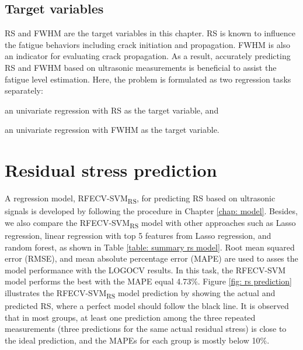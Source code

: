 \subsection{Target variables}
RS and FWHM are the target variables in this chapter. RS is known to influence the fatigue behaviors including crack initiation and propagation. FWHM is also an indicator for evaluating crack propagation. As a result, accurately predicting RS and FWHM based on ultrasonic measurements is beneficial to assist the fatigue level estimation. Here, the problem is formulated as two regression tasks separately:
\begin{enumerate*}[label=\itshape\alph*\upshape)]
    \item an univariate regression with RS as the target variable, and
    \item an univariate regression with FWHM as the target variable.
\end{enumerate*}


\section{Residual stress prediction}
\label{sec: rs prediction}
A regression model, RFECV-SVM\textsubscript{RS}, for predicting RS based on ultrasonic signals is developed by following the procedure in Chapter \ref{chap: model}. Besides, we also compare the RFECV-SVM\textsubscript{RS} model with other approaches such as Lasso regression, linear regression with top 5 features from Lasso regression, and random forest, as shown in Table \ref{table: summary rs model}. Root mean squared error (RMSE), and mean absolute percentage error (MAPE) are used to asses the model performance with the LOGOCV results. In this task, the RFECV-SVM model performs the best with the MAPE equal 4.73\%. Figure \ref{fig: rs prediction} illustrates the RFECV-SVM\textsubscript{RS} model prediction by showing the actual and predicted RS, where a perfect model should follow the black line. It is observed that in most groups, at least one prediction among the three repeated measurements (three predictions for the same actual residual stress) is close to the ideal prediction, and the MAPEs for each group is mostly below 10\%.

